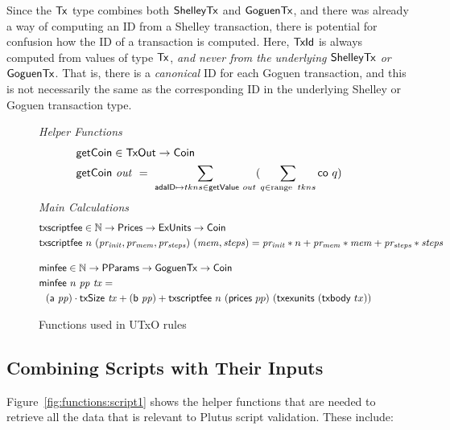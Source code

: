 Since the $\mathsf{Tx}$ type combines both $\mathsf{ShelleyTx}$ and $\mathsf{GoguenTx}$, and
there was already a way of computing an ID from a Shelley transaction, there
is potential for confusion how the ID of a transaction is
computed. Here, $\mathsf{TxId}$ is always computed from values of type $\mathsf{Tx}$,
\emph{and never from the underlying $\mathsf{ShelleyTx}$ or $\mathsf{GoguenTx}$}.  That is, there is a \emph{canonical} ID for each Goguen transaction,
and this is not necessarily the same as the corresponding ID in the underlying Shelley or Goguen transaction type.

\begin{figure}[htb]
  \emph{Helper Functions}
  \begin{align*}
    & \mathsf{getCoin} \in \mathsf{TxOut} \to \mathsf{Coin} \\
    & \mathsf{getCoin}~{\mathit{out}} ~=~\sum_{\mathsf{adaID} \mapsto tkns \in \mathsf{getValue}~out}
       (\sum_{q \in \operatorname{range}~{tkns}} \mathsf{co}~q)
  \end{align*}
  \emph{Main Calculations}
  \begin{align*}
    & \fun{txscriptfee} \in \N \to \Prices \to \ExUnits \to \Coin \\
    & \fun{txscriptfee}~n~ (\var{pr_{init}, pr_{mem}, pr_{steps}})~ (\var{mem, steps})
    = \var{pr_{init}}*n + \var{pr_{mem}}*\var{mem} + \var{pr_{steps}}*\var{steps}
    \nextdef
    &\fun{minfee} \in \N \to \PParams \to \GoguenTx \to \Coin \\
    &\fun{minfee}  ~n~\var{pp}~\var{tx} = \\
    &~~(\fun{a}~\var{pp}) \cdot \fun{txSize}~\var{tx} + (\fun{b}~\var{pp}) +
    \fun{txscriptfee}~n~(\fun{prices}~{pp})~(\fun{txexunits}~(\fun{txbody}~{tx}))
  \end{align*}
  \caption{Functions used in UTxO rules}
  \label{fig:functions:utxo}
\end{figure}

\subsection{Combining Scripts with Their Inputs}
\label{sec:scripts-inputs}

Figure~\ref{fig:functions:script1} shows the helper functions that are needed to
retrieve all the data that is relevant to Plutus script validation.
These include:

